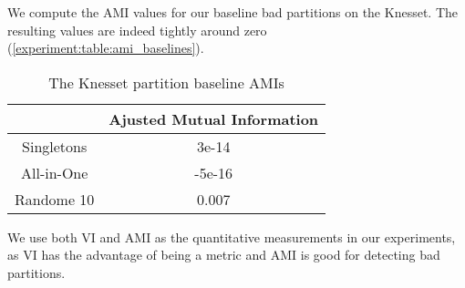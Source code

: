 We compute the AMI values for our baseline bad partitions on the Knesset.
The resulting values are indeed tightly around zero
(\autoref{experiment:table:ami_baselines}).

\begin{table}[ht]
\centering
\begin{tabular}{|c|c|}
\hline
       & Ajusted Mutual Information \\ \hline
Singletons & 3e-14 \\
All-in-One & -5e-16 \\
Randome 10 & 0.007 \\
\hline
\end{tabular}
\caption{The Knesset partition baseline AMIs}
\label{experiment:table:ami_baselines}
\end{table}

We use both VI and AMI as the quantitative measurements in our experiments,
as VI has the advantage of being a metric and AMI is good for detecting bad
partitions.
